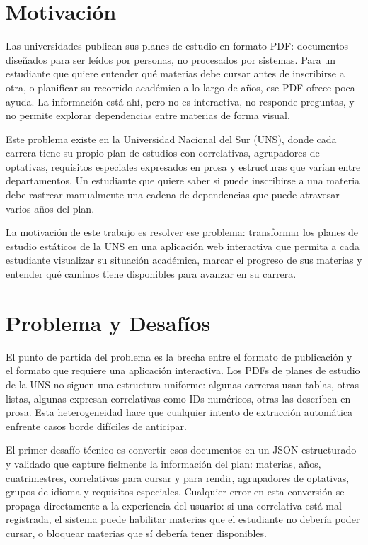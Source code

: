 \documentclass[12pt, a4paper]{report}
\begin{document}
\section{Motivación}

Las universidades publican sus planes de estudio en formato PDF: documentos diseñados para
ser leídos por personas, no procesados por sistemas. Para un estudiante que quiere entender
qué materias debe cursar antes de inscribirse a otra, o planificar su recorrido académico a
lo largo de años, ese PDF ofrece poca ayuda. La información está ahí, pero no es
interactiva, no responde preguntas, y no permite explorar dependencias entre materias de
forma visual.

Este problema existe en la Universidad Nacional del Sur (UNS), donde cada carrera tiene su
propio plan de estudios con correlativas, agrupadores de optativas, requisitos especiales
expresados en prosa y estructuras que varían entre departamentos. Un estudiante que quiere
saber si puede inscribirse a una materia debe rastrear manualmente una cadena de
dependencias que puede atravesar varios años del plan.

La motivación de este trabajo es resolver ese problema: transformar los planes de estudio
estáticos de la UNS en una aplicación web interactiva que permita a cada estudiante
visualizar su situación académica, marcar el progreso de sus materias y entender qué
caminos tiene disponibles para avanzar en su carrera.

\section{Problema y Desafíos}

El punto de partida del problema es la brecha entre el formato de publicación y el formato
que requiere una aplicación interactiva. Los PDFs de planes de estudio de la UNS no siguen
una estructura uniforme: algunas carreras usan tablas, otras listas, algunas expresan
correlativas como IDs numéricos, otras las describen en prosa. Esta heterogeneidad hace que
cualquier intento de extracción automática enfrente casos borde difíciles de anticipar.

El primer desafío técnico es convertir esos documentos en un JSON estructurado y validado
que capture fielmente la información del plan: materias, años, cuatrimestres, correlativas
para cursar y para rendir, agrupadores de optativas, grupos de idioma y requisitos
especiales. Cualquier error en esta conversión se propaga directamente a la experiencia del
usuario: si una correlativa está mal registrada, el sistema puede habilitar materias que el
estudiante no debería poder cursar, o bloquear materias que sí debería tener disponibles.
\end{document}
